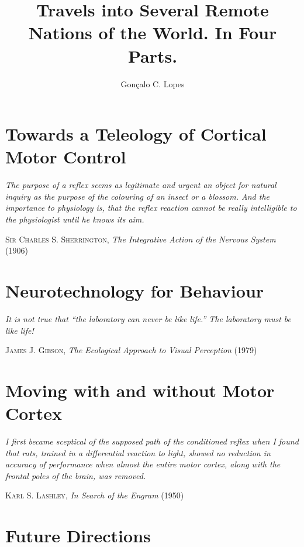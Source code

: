 \documentclass[11pt,lot,lof,b5paper]{puthesis}
\title{Travels into Several Remote Nations of the World. In Four Parts.}
\author{Gonçalo C. Lopes}
\let\originalepigraph\epigraph
\renewcommand\epigraph[2]{\originalepigraph{\textit{#1}}{#2}}
\renewcommand{\maketitlepage}{}
\begin{document}
% 
% 



\maketitlepage
\makefrontmatter



\chapter{Towards a Teleology of Cortical Motor Control}
\epigraph{The purpose of a reflex seems as legitimate and urgent an object for natural inquiry as the purpose of the colouring of an insect or a blossom. And the importance to physiology is, that the reflex reaction cannot be really intelligible to the physiologist until he knows its aim.}{\textsc{Sir Charles S. Sherrington}, \textit{The Integrative Action of the Nervous System} (1906)}


\chapter{Neurotechnology for Behaviour}
\epigraph{It is not true that ``the laboratory can never be like life.'' The laboratory \emph{must} be like life!}{\textsc{James J. Gibson}, \textit{The Ecological Approach to Visual Perception} (1979)}


\chapter{Moving with and without Motor Cortex}
\epigraph{I first became sceptical of the supposed path of the conditioned reflex when I found that rats, trained in a differential reaction to light, showed no reduction in accuracy of performance when almost the entire motor cortex, along with the frontal poles of the brain, was removed.}{\textsc{Karl S. Lashley}, \textit{In Search of the Engram} (1950)}


\chapter{Future Directions}


%
%


\singlespacing


\cleardoublepage
\ifdefined{}
\else

\fi




% 
% 

\end{document}
